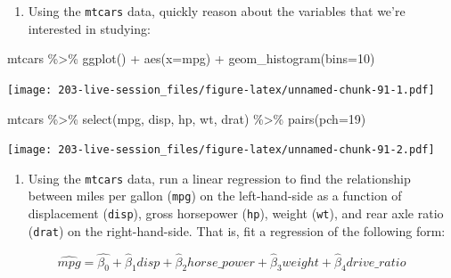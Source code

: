 \documentclass[
]{book}
\newenvironment{Shaded}{\begin{snugshade}}{\end{snugshade}}
\newcommand{\AttributeTok}[1]{\textcolor[rgb]{0.77,0.63,0.00}{#1}}
\newcommand{\DecValTok}[1]{\textcolor[rgb]{0.00,0.00,0.81}{#1}}
\newcommand{\FunctionTok}[1]{\textcolor[rgb]{0.00,0.00,0.00}{#1}}
\newcommand{\NormalTok}[1]{#1}
\newcommand{\SpecialCharTok}[1]{\textcolor[rgb]{0.00,0.00,0.00}{#1}}
\providecommand{\tightlist}{%
  \setlength{\itemsep}{0pt}\setlength{\parskip}{0pt}}
\theoremstyle{definition}
\theoremstyle{definition}
\theoremstyle{definition}
\theoremstyle{definition}
\theoremstyle{remark}
\begin{document}
\begin{enumerate}
\def\labelenumi{\arabic{enumi}.}
\setcounter{enumi}{-1}
\tightlist
\item
  Using the \texttt{mtcars} data, quickly reason about the variables that we're interested in studying:
\end{enumerate}

\begin{Shaded}
\begin{Highlighting}[]
\NormalTok{mtcars }\SpecialCharTok{\%\textgreater{}\%} 
  \FunctionTok{ggplot}\NormalTok{() }\SpecialCharTok{+} 
  \FunctionTok{aes}\NormalTok{(}\AttributeTok{x=}\NormalTok{mpg) }\SpecialCharTok{+}
  \FunctionTok{geom\_histogram}\NormalTok{(}\AttributeTok{bins=}\DecValTok{10}\NormalTok{)}
\end{Highlighting}
\end{Shaded}

\texttt{[image: 203-live-session\_files/figure-latex/unnamed-chunk-91-1.pdf]}

\begin{Shaded}
\begin{Highlighting}[]
\NormalTok{mtcars }\SpecialCharTok{\%\textgreater{}\%} 
  \FunctionTok{select}\NormalTok{(mpg, disp, hp, wt, drat) }\SpecialCharTok{\%\textgreater{}\%} 
  \FunctionTok{pairs}\NormalTok{(}\AttributeTok{pch=}\DecValTok{19}\NormalTok{)}
\end{Highlighting}
\end{Shaded}

\texttt{[image: 203-live-session\_files/figure-latex/unnamed-chunk-91-2.pdf]}

\begin{enumerate}
\def\labelenumi{\arabic{enumi}.}
\tightlist
\item
  Using the \texttt{mtcars} data, run a linear regression to find the relationship between miles per gallon (\texttt{mpg}) on the left-hand-side as a function of displacement (\texttt{disp}), gross horsepower (\texttt{hp}), weight (\texttt{wt}), and rear axle ratio (\texttt{drat}) on the right-hand-side. That is, fit a regression of the following form:
\end{enumerate}

\[
\widehat{mpg} = \hat{\beta_{0}} + \hat{\beta}_{1} disp + \hat{\beta}_{2}horse\_power + \hat{\beta}_{3}weight + \hat{\beta}_{4}drive\_ratio
\]
\end{document}
